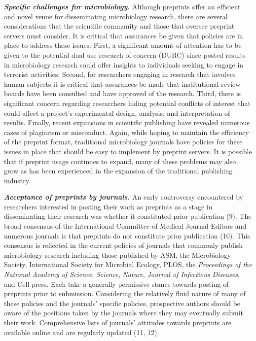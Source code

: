 \documentclass[11pt,]{article}
\begin{document}
\textbf{\emph{Specific challenges for microbiology.}} Although preprints
offer an efficient and novel venue for disseminating microbiology
research, there are several considerations that the scientific community
and those that oversee preprint servers must consider. It is critical
that assurances be given that policies are in place to address these
issues. First, a significant amount of attention has to be given to the
potential dual use research of concern (DURC) since posted results in
microbiology research could offer insights to individuals seeking to
engage in terrorist activities. Second, for researchers engaging in
research that involves human subjects it is critical that assurances be
made that institutional review boards have been consulted and have
approved of the research. Third, there is significant concern regarding
researchers hiding potential conflicts of interest that could affect a
project's experimental design, analysis, and interpretation of results.
Finally, recent expansions in scientific publishing have revealed
numerous cases of plagiarism or misconduct. Again, while hoping to
maintain the efficiency of the preprint format, traditional microbiology
journals have policies for these issues in place that should be easy to
implement by preprint servers. It is possible that if preprint usage
continues to expand, many of these problems may also grow as has been
experienced in the expansion of the traditional publishing industry.

\textbf{\emph{Acceptance of preprints by journals.}} An early
controversy encountered by researchers interested in posting their work
as preprints as a stage in disseminating their research was whether it
constituted prior publication (9). The broad consensus of the
International Committee of Medical Journal Editors and numerous journals
is that preprints do not constitute prior publication (10). This
consensus is reflected in the current policies of journals that commonly
publish microbiology research including those published by ASM, the
Microbiology Society, International Society for Microbial Ecology, PLOS,
the \emph{Proceedings of the National Academy of Science},
\emph{Science}, \emph{Nature}, \emph{Journal of Infectious Diseases},
and Cell press. Each take a generally permissive stance towards posting
of preprints prior to submission. Considering the relatively fluid
nature of many of these policies and the journals' specific policies,
prospective authors should be aware of the positions taken by the
journals where they may eventually submit their work. Comprehensive
lists of journals' attitudes towards preprints are available online and
are regularly updated (11, 12).
\end{document}
